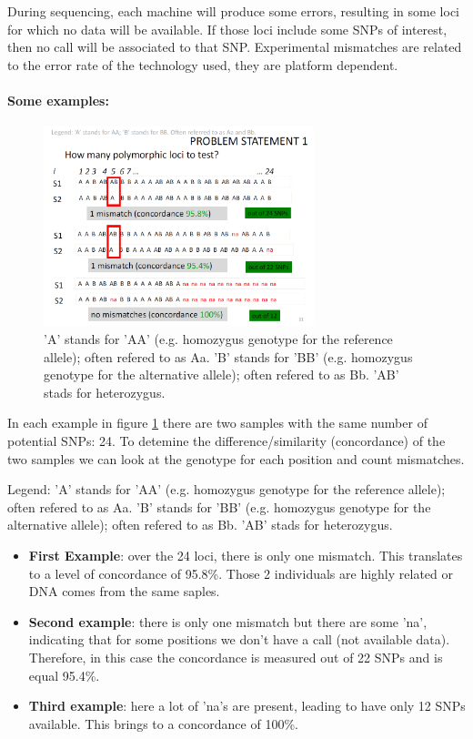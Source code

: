 During sequencing, each machine will produce some errors, resulting in some loci
for which no data will be available. If those loci include some SNPs of
interest, then no call will be associated to that SNP. Experimental mismatches
are related to the error rate of the technology used, they are platform
dependent. 

\paragraph{Some examples:}

\begin{figure}[h]
	\centering
	\includegraphics[width=0.7\textwidth]{SNP_number.PNG}
	\caption{'A' stands for 'AA' (e.g. homozygus genotype for the reference
	allele); often refered to as Aa. 'B' stands for 'BB' (e.g. homozygus
	genotype for the alternative allele); often refered to as Bb. 'AB' stads for
	heterozygus.}
	\label{fig:SNP_number}  
\end{figure}

In each example in figure \ref{fig:SNP_number} there are two samples with the
same number of potential SNPs: 24. To detemine the difference/similarity
(concordance) of the two samples we can look at the genotype for each position
and count mismatches.

Legend: 'A' stands for 'AA' (e.g. homozygus genotype for the reference allele);
often refered to as Aa. 'B' stands for 'BB' (e.g. homozygus genotype for the
alternative allele); often refered to as Bb. 'AB' stads for heterozygus.

\begin{itemize}
	\item \textbf{First Example}: over the 24 loci, there is only one mismatch.
	This translates to a level of concordance of 95.8\%. Those 2 individuals are
	highly related or DNA comes from the same saples. 
	   
	\item \textbf{Second example}: there is only one mismatch but there are some
	'na', indicating that for some positions we don't have a call (not available
	data). Therefore, in this case the concordance is measured out of 22 SNPs
	and is equal 95.4\%. 

	\item \textbf{Third example}: here a lot of 'na's are present, leading to
	have only 12 SNPs available. This brings to a concordance of 100\%. 
\end{itemize}

